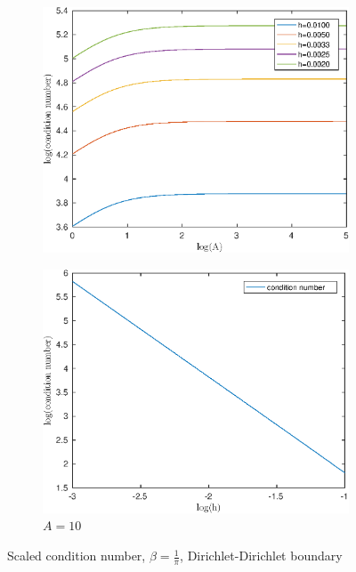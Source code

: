 \documentclass[12pt]{article}
\begin{document}
\begin{figure}[h!]
\centering
\begin{subfigure}{0.4\textwidth}
\includegraphics[width=\textwidth]{cond-A-pi-DD}
\caption{}
\end{subfigure}
\hfill
\begin{subfigure}{0.4\textwidth}
\includegraphics[width=\textwidth]{cond-N-pi-DD}
\caption{$A=10$}
\end{subfigure}
\caption{Scaled condition number, $\beta=\frac{1}{\pi}$, Dirichlet-Dirichlet boundary}
\end{figure}
\end{document}

